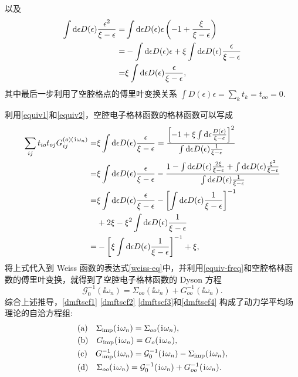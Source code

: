 以及 
\begin{equation}
    \begin{aligned}
        \int\mathrm{d}\epsilon D(\epsilon)\frac{\epsilon^2}{\xi-\epsilon}=& \int\mathrm{d}\epsilon D(\epsilon)\epsilon \left( -1+\frac{\xi}{\xi-\epsilon} \right)\\
        =&-\int\mathrm{d}\epsilon D(\epsilon)\epsilon +\xi\int\mathrm{d}\epsilon D(\epsilon)\frac{\epsilon}{\xi-\epsilon}\\
        =&\xi\int\mathrm{d}\epsilon D(\epsilon)\frac{\epsilon}{\xi-\epsilon},
    \end{aligned}\label{equiv2}
\end{equation}
其中最后一步利用了空腔格点的傅里叶变换关系 $\int D(\epsilon)\epsilon=\sum_kt_k=t_{oo}=0$.

利用\eqref{equiv1}和\eqref{equiv2}，空腔电子格林函数的格林函数可以写成
\begin{equation}
    \begin{aligned}
        \sum_{ij}t_{io}t_{oj}G_{ij}^{(o)(\hspace{0.1em}\mathrm{i}\hspace{0.1em}\omega_n)}=& \xi\int\mathrm{d}\epsilon D(\epsilon)\frac{\epsilon}{\xi-\epsilon}=\frac{\left[ -1+\xi\int\mathrm{d}\epsilon \frac{D(\epsilon)}{\xi-\epsilon} \right]^2}{\int\mathrm{d}\epsilon D(\epsilon)\frac{1}{\xi-\epsilon}}\\
        =& \xi\int\mathrm{d}\epsilon D(\epsilon)\frac{\epsilon}{\xi-\epsilon}-\frac{1-\int\mathrm{d}\epsilon D(\epsilon)\frac{2\xi}{\xi-\epsilon}+\int\mathrm{d}\epsilon D(\epsilon)\frac{\xi^2}{\xi-\epsilon}}{\int\mathrm{d}\epsilon D(\epsilon)\frac{1}{\xi-\epsilon}}\\
        =& \xi\int\mathrm{d}\epsilon D(\epsilon)\frac{\epsilon}{\xi-\epsilon} -\left[ \int\mathrm{d}\epsilon D(\epsilon)\frac{1}{\xi-\epsilon} \right]^{-1} \\
        &+2\xi-\xi^2 \int\mathrm{d}\epsilon D(\epsilon)\frac{1}{\xi-\epsilon}\\
        =& -\left[ \xi\int\mathrm{d}\epsilon D(\epsilon)\frac{1}{\xi-\epsilon} \right]^{-1}+\xi,
    \end{aligned}
\end{equation}
将上式代入到 Weiss 函数的表达式\eqref{weiss-eq}中，并利用\eqref{equiv-freq}和空腔格林函数的傅里叶变换，就得到了空腔电子格林函数的 Dyson 方程 
\begin{equation}
    \mathcal{G}_0^{-1}(\ii\omega_n)=\Sigma_{oo}(\ii\omega_n)+G_{oo}^{-1}(\ii\omega_n).\label{dmftscf4}
\end{equation}
综合上述推导，\eqref{dmftscf1} \eqref{dmftscf2} \eqref{dmftscf3}和\eqref{dmftscf4} 构成了动力学平均场理论的自洽方程组:
\begin{equation}
    \begin{aligned}
        & \mathrm{(a)}\quad \Sigma_{\mathrm{imp}}(\hspace{0.1em}\mathrm{i}\hspace{0.1em}\omega_n)=\Sigma_{oo}(\hspace{0.1em}\mathrm{i}\hspace{0.1em}\omega_n),\\
        & \mathrm{(b)}\quad G_{\mathrm{imp}}(\hspace{0.1em}\mathrm{i}\hspace{0.1em}\omega_n)=G_{o}(\hspace{0.1em}\mathrm{i}\hspace{0.1em}\omega_n),\\
        & \mathrm{(c)}\quad G^{-1}_{\mathrm{imp}}(\hspace{0.1em}\mathrm{i}\hspace{0.1em}\omega_n)=\mathcal{G}_0^{-1}(\hspace{0.1em}\mathrm{i}\hspace{0.1em}\omega_n)-\Sigma_{\mathrm{imp}}(\hspace{0.1em}\mathrm{i}\hspace{0.1em}\omega_n),\\
        & \mathrm{(d)}\quad \Sigma_{oo}(\hspace{0.1em}\mathrm{i}\hspace{0.1em}\omega_n)=\mathcal{G}_0^{-1}(\hspace{0.1em}\mathrm{i}\hspace{0.1em}\omega_n)+G_{oo}^{-1}(\hspace{0.1em}\mathrm{i}\hspace{0.1em}\omega_n).
    \end{aligned}
\end{equation}
